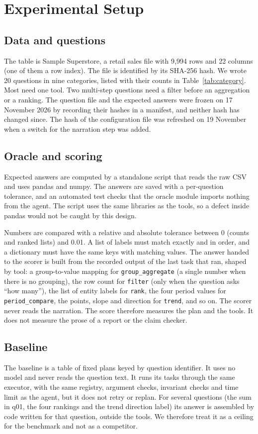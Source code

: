 \section{Experimental Setup}
\subsection{Data and questions}
The table is Sample Superstore, a retail sales file with 9{,}994 rows and 22 columns (one of them a row index). The file is identified by its SHA-256 hash. We wrote 20 questions in nine categories, listed with their counts in Table~\ref{tab:category}. Most need one tool. Two multi-step questions need a filter before an aggregation or a ranking. The question file and the expected answers were frozen on 17 November 2026 by recording their hashes in a manifest, and neither hash has changed since. The hash of the configuration file was refreshed on 19 November when a switch for the narration step was added.

\subsection{Oracle and scoring}
Expected answers are computed by a standalone script that reads the raw CSV and uses pandas and numpy. The answers are saved with a per-question tolerance, and an automated test checks that the oracle module imports nothing from the agent. The script uses the same libraries as the tools, so a defect inside pandas would not be caught by this design.

Numbers are compared with a relative and absolute tolerance between 0 (counts and ranked lists) and 0.01. A list of labels must match exactly and in order, and a dictionary must have the same keys with matching values. The answer handed to the scorer is built from the recorded output of the last task that ran, shaped by tool: a group-to-value mapping for \texttt{group\_aggregate} (a single number when there is no grouping), the row count for \texttt{filter} (only when the question asks ``how many''), the list of entity labels for \texttt{rank}, the four period values for \texttt{period\_compare}, the points, slope and direction for \texttt{trend}, and so on. The scorer never reads the narration. The score therefore measures the plan and the tools. It does not measure the prose of a report or the claim checker.

\subsection{Baseline}
The baseline is a table of fixed plans keyed by question identifier. It uses no model and never reads the question text. It runs its tasks through the same executor, with the same registry, argument checks, invariant checks and time limit as the agent, but it does not retry or replan. For several questions (the sum in q01, the four rankings and the trend direction label) its answer is assembled by code written for that question, outside the tools. We therefore treat it as a ceiling for the benchmark and not as a competitor.

